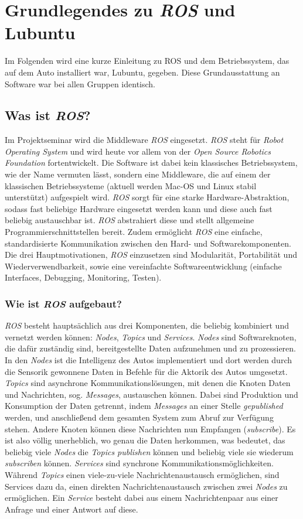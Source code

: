 \section{Grundlegendes zu \textit{ROS} und Lubuntu}
\label{sec:grundlegendesROS-OS}   
Im Folgenden wird eine kurze Einleitung zu ROS und dem Betriebssystem, das auf dem Auto installiert war, Lubuntu, gegeben. Diese Grundausstattung an Software war bei allen Gruppen identisch.
\subsection{Was ist \textit{ROS}?}
Im Projektseminar wird die Middleware \textit{ROS} eingesetzt. \textit{ROS} steht für \textit{Robot Operating System} und wird heute vor allem von der \textit{Open Source Robotics Foundation} fortentwickelt. Die Software ist dabei kein klassisches Betriebssystem, wie der Name vermuten lässt, sondern eine Middleware, die auf einem der klassischen Betriebssysteme (aktuell werden Mac-OS und Linux stabil unterstützt) aufgespielt wird. \textit{ROS} sorgt für eine starke Hardware-Abstraktion, sodass fast beliebige Hardware eingesetzt werden kann und diese auch fast beliebig austauschbar ist. \textit{ROS} abstrahiert diese und stellt allgemeine Programmierschnittstellen bereit. Zudem ermöglicht \textit{ROS} eine einfache, standardisierte Kommunikation zwischen den Hard- und Softwarekomponenten.
Die drei Hauptmotivationen, \textit{ROS} einzusetzen sind Modularität, Portabilität und Wiederverwendbarkeit, sowie eine vereinfachte Softwareentwicklung (einfache Interfaces, Debugging, Monitoring, Testen).

\subsubsection{Wie ist \textit{ROS} aufgebaut?}
\textit{ROS} besteht hauptsächlich aus drei Komponenten, die beliebig kombiniert und vernetzt werden können: \textit{Nodes}, \textit{Topics} und \textit{Services}. \textit{Nodes} sind Softwareknoten, die dafür zuständig sind, bereitgestellte Daten aufzunehmen und zu prozessieren. In den \textit{Nodes} ist die Intelligenz des Autos implementiert und dort werden durch die Sensorik gewonnene Daten in Befehle für die Aktorik des Autos umgesetzt. 
\textit{Topics} sind asynchrone Kommunikationslösungen, mit denen die Knoten Daten und Nachrichten, sog. \textit{Messages}, austauschen können. Dabei sind Produktion und Konsumption der Daten getrennt, indem \textit{Messages} an einer Stelle \textit{gepublished} werden, und anschließend dem gesamten System zum Abruf zur Verfügung stehen. Andere Knoten können diese Nachrichten nun Empfangen (\textit{subscribe}). Es ist also völlig unerheblich, wo genau die Daten herkommen, was bedeutet, das beliebig viele \textit{Nodes} die \textit{Topics publishen} können und beliebig viele sie wiederum \textit{subscriben} können. 
\textit{Services} sind synchrone Kommunikationsmöglichkeiten. Während \textit{Topics} einen viele-zu-viele Nachrichtenaustausch ermöglichen, sind Services dazu da, einen direkten Nachrichtenaustausch zwischen zwei \textit{Nodes} zu ermöglichen. Ein \textit{Service} besteht dabei aus einem Nachrichtenpaar aus einer Anfrage und einer Antwort auf diese. 

